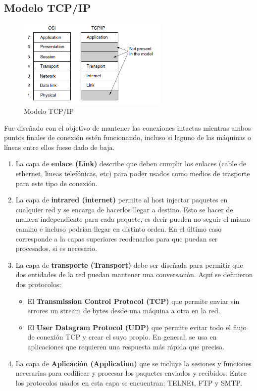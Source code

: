 \subsection{Modelo TCP/IP}
\begin{figure}[H]
	\centering
	\includegraphics[width=0.65\textwidth
]{images/tcpip.png}
	\caption[Modelo TCP/IP de Referencia]{Modelo TCP/IP}
	\label{fig:tcp}
\end{figure}

Fue diseñado con el objetivo de mantener las conexiones intactas mientras ambos puntos finales de conexión estén funcionando, incluso si laguno de las máquinas o líneas entre ellos fuese dado de baja.

\begin{enumerate}
  \item La capa de \textbf{enlace (Link)} describe que deben cumplir los enlaces (cable de ethernet, lineas telefónicas, etc) para poder usados como medios de trasporte para este tipo de conexión.
  \item La capa de \textbf{intrared (internet)} permite al host injectar paquetes en cualquier red y se encarga de hacerlos llegar a destino. Esto se hacer de manera independiente para cada paquete, es decir pueden no seguir el mismo camino e incluso podrían llegar en distinto orden. En el último caso corresponde a la capas superiores reodenarlos para que puedan ser procesados, si es necesario.
  \item La capa de \textbf{transporte (Transport)} debe ser diseñada para permitir que dos entidades de la red puedan mantener una conversación. Aquí se definieron dos protocolos:
  \begin{itemize}
    \item El \textbf{Transmission Control Protocol (TCP)} que permite enviar sin errores un stream de bytes desde una máquina a otra en la red.
    \item El \textbf{User Datagram Protocol (UDP)} que permite evitar todo el flujo de conexión TCP y crear el suyo propio. En general, se usa en aplicaciones que requieren una respuesta más rápida que precisa. 
  \end{itemize}
  \item La capa de \textbf{Aplicación (Application)} que se incluye la sesiones y funciones necesarias para codificar y procesar los paquetes enviados y recibidos. Entre los protocolos usados en esta capa se encuentran: TELNEt, FTP y SMTP.
\end{enumerate}
